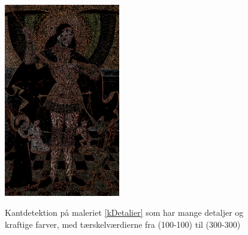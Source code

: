 \begin{figure}[p]
{        \includegraphics[angle=0,width=0.45\textwidth]{afsnit/afprovning/billeder/thressholds/krafitige_farver/krafite_detalier/1_iteration/200-200.png}
        \label{200-200}}
    \hspace{1em}
    \caption{Kantdetektion på maleriet \ref{kDetalier} som har mange detaljer og kraftige farver, med tærskelværdierne fra (100-100) til (300-300)}
	\label{allesammen1}
\end{figure}

\clearpage

